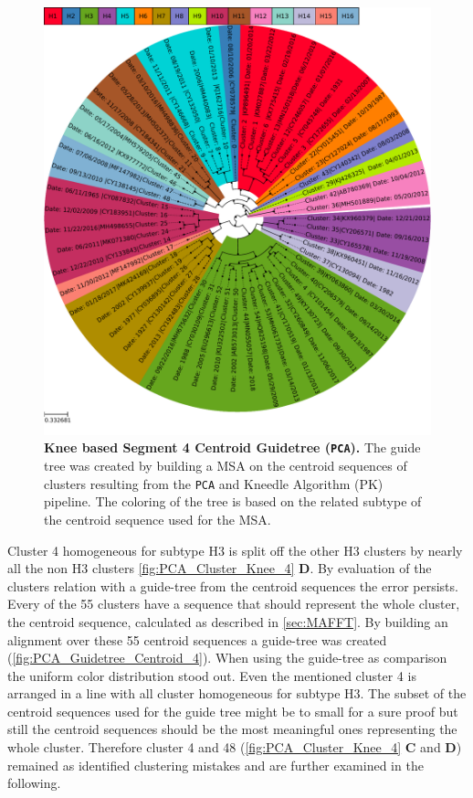 \begin{figure}[!hbt]
    \centering
    \includegraphics[width=\textwidth]{PCA/Guidetree_segment_4_H_Centroid.pdf}
    \caption[Knee based Segment 4 Centroid Guidetree (\texttt{PCA})]{\textbf{Knee based Segment 4 Centroid Guidetree (\texttt{PCA}).} The guide tree was created by building a \gls{MSA} on the centroid sequences of clusters resulting from the \texttt{PCA} and Kneedle Algorithm (PK) pipeline. The coloring of the tree is based on the related subtype of the centroid sequence used for the \gls{MSA}.}
    \label{fig:PCA_Guidetree_Centroid_4}
\end{figure}

Cluster 4 homogeneous for subtype H3 is split off the other H3 clusters by nearly all the non H3 clusters \autoref{fig:PCA_Cluster_Knee_4} \textbf{\textsf{D}}. By evaluation of the clusters relation with a guide-tree from the centroid sequences the error persists. Every of the 55 clusters have a sequence that should represent the whole cluster, the centroid sequence, calculated as described in \autoref{sec:MAFFT}. By building an alignment over these 55 centroid sequences a guide-tree was created (\autoref{fig:PCA_Guidetree_Centroid_4}). When using the guide-tree as comparison the uniform color distribution stood out. Even the mentioned cluster 4 is arranged in a line with all cluster homogeneous for subtype H3. The subset of the centroid sequences used for the guide tree might be to small for a sure proof but still the centroid sequences should be the most meaningful ones representing the whole cluster. Therefore cluster 4 and 48 (\autoref{fig:PCA_Cluster_Knee_4} \textbf{\textsf{C}} and \textbf{\textsf{D}}) remained as identified clustering mistakes and are further examined in the following.

